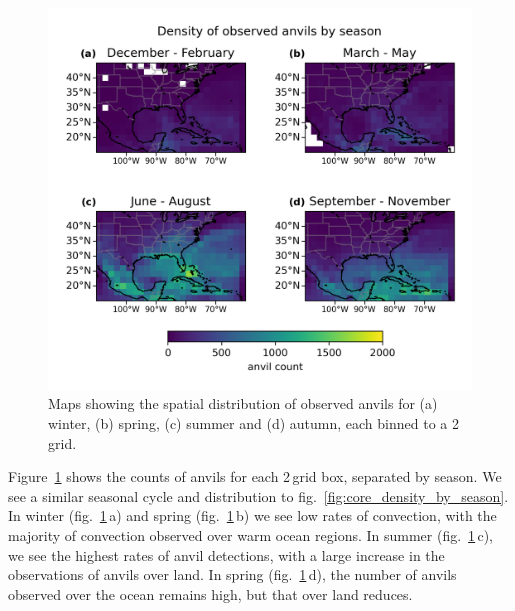 \begin{figure}[tp]
    \centering
    \includegraphics[width=\textwidth]{figures/chapter2_16.png}
    \caption[
    Maps showing the spatial distribution of observed anvils by season
    ]{
    Maps showing the spatial distribution of observed anvils for (a) winter, (b) spring, (c) summer and (d) autumn, each binned to a 2\,\textdegree grid.
    }
    \label{fig:anvil_distribution_map}
\end{figure}

Figure~\ref{fig:anvil_distribution_map} shows the counts of anvils for each 2\,\textdegree grid box, separated by season.
We see a similar seasonal cycle and distribution to fig.~\ref{fig:core_density_by_season}.
In winter (fig.~\ref{fig:anvil_distribution_map}\,a) and spring (fig.~\ref{fig:anvil_distribution_map}\,b) we see low rates of convection, with the majority of convection observed over warm ocean regions.
In summer (fig.~\ref{fig:anvil_distribution_map}\,c), we see the highest rates of anvil detections, with a large increase in the observations of anvils over land.
In spring (fig.~\ref{fig:anvil_distribution_map}\,d), the number of anvils observed over the ocean remains high, but that over land reduces.


